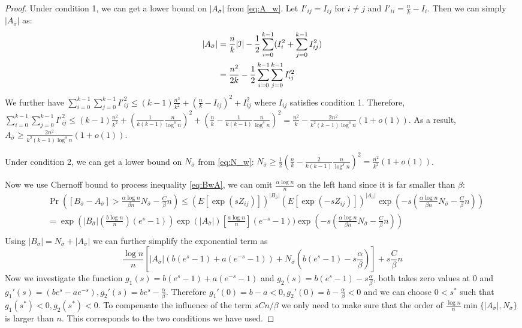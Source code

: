 \documentclass{article}
\begin{document}
\begin{proof}
	Under condition 1, we can get a lower bound on $|A_{\bar{\sigma}}|$ from \eqref{eq:A_w}. Let $I'_{ij} = I_{ij}$ for $i\neq j$ and
	$I'_{ii} = \frac{n}{k} - I_i$. Then we can simply $|A_{\bar{\sigma}}|$ as:
	\begin{align*}
	|A_{\bar{\sigma}}| &= \frac{n}{k}|\mathcal{I}| - \frac{1}{2}\sum_{i=0}^{k-1}  (I^2_i + \sum_{j=0}^{k-1} I^2_{ij}) \\
	&= \frac{n^2}{2k} - \frac{1}{2} \sum_{i=0}^{k-1} \sum_{j=0}^{k-1} I'^2_{ij}
	\end{align*}
	We further have $\sum_{i=0}^{k-1} \sum_{j=0}^{k-1} I'^2_{ij} \leq (k-1)\frac{n^2}{k^2} + (\frac{n}{k} - I_{ij})^2 + I^2_{ij}$ where
	$I_{ij}$ satisfies condition 1. Therefore, $\sum_{i=0}^{k-1} \sum_{j=0}^{k-1} I'^2_{ij} \leq (k-1)\frac{n^2}{k^2} + (\frac{1}{k(k-1)}\frac{n}{\log^{\delta} n})^2
	+ (\frac{n}{k} - \frac{1}{k(k-1)}\frac{n}{\log^{\delta} n})^2 = \frac{n^2}{k} - \frac{2n^2}{k^2 (k-1)\log^\delta n}(1+o(1))$.
	As a result, $A_{\bar{\sigma}} \geq \frac{2n^2}{k^2 (k-1)\log^\delta n}(1+o(1))$.
	
	Under condition 2, we can get a lower bound on $N_{\bar{\sigma}}$ from \eqref{eq:N_w}: $N_{\bar{\sigma}} \geq \frac{1}{2}(\frac{n}{k} - \frac{2}{k(k-1)}\frac{n}{\log^{\delta} n})^2 = \frac{n^2}{k^2}(1+o(1))$.
	
	Now we use Chernoff bound to process inequality \eqref{eq:BwA}, we can omit $\frac{\alpha \log n}{n}$ on the left hand since it is far smaller than $\beta$:
	\begin{align*}
	&\Pr([B_{\bar{\sigma}} - A_{\bar{\sigma}}] >  \frac{\alpha \log n}{\beta n} N_{\bar{\sigma}}  - \frac{C}{\beta}n)
	\leq (E[\exp(sZ_{ij})])^{|B_{\bar{\sigma}}|}(E[\exp(-sZ_{ij})])^{|A_{\bar{\sigma}}|} \exp(-s(\frac{\alpha \log n}{\beta n} N_{\bar{\sigma}}  - \frac{C}{\beta}n)) \\
	& =\exp(|B_{\bar{\sigma}}|(\frac{b\log n}{n})(e^s -1)) \exp(|A_{\bar{\sigma}}|)[\frac{a\log n}{n}] (e^{-s} - 1))\exp(-s(\frac{\alpha \log n}{\beta n} N_{\bar{\sigma}}  - \frac{C}{\beta}n)) \\
	\end{align*}
	Using $|B_{\bar{\sigma}}| = N_{\bar{\sigma}} + |A_{\bar{\sigma}}|$ we can further simplify the exponential term as
	$$
	\frac{\log n}{n} [|A_{\bar{\sigma}}|(b(e^s -1)+ a(e^{-s} - 1)) +
	N_{\bar{\sigma}} (b(e^s - 1)-s\frac{\alpha}{\beta})]  + s \frac{C}{\beta}n
	$$
	Now we investigate the function $g_1(s) = b(e^s -1)+ a(e^{-s} - 1)$ and $g_2(s) = b(e^s - 1)-s\frac{\alpha}{\beta}$,
	both takes zero values at $0$ and $g_1'(s) = (be^s - ae^{-s}), g_2'(s) = be^s -\frac{\alpha}{\beta}$.
	Therefore $g_1'(0) = b-a<0, g_2'(0) = b - \frac{\alpha}{\beta} < 0$ and we can choose $0<s^*$ such that $g_1(s^*) < 0,g_2(s^*) < 0$.
	To compensate the influence of the term $sCn/\beta$ we only need to make sure that the order of $\frac{\log n}{n} \min\{|A_{\bar{\sigma}}|, N_{\bar{\sigma}}\}$ is larger than $n$.
	This corresponds to the two conditions we have used.
\end{proof}
\end{document}
